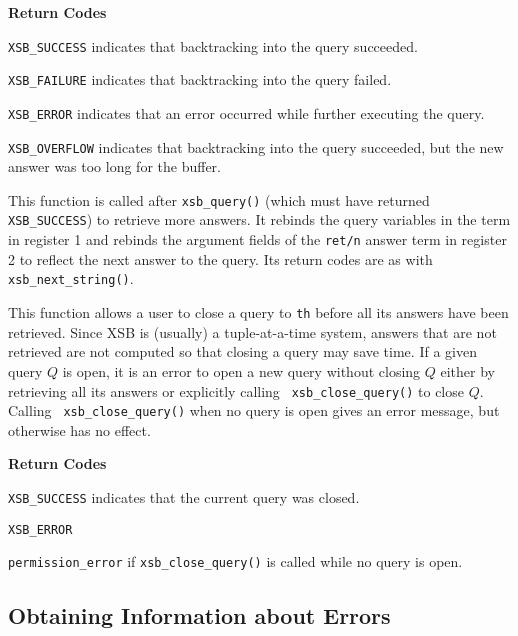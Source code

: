 \begin{description}
{\bf Return Codes}  
\bi
\item {\tt XSB\_SUCCESS} indicates that backtracking into the query succeeded.
%
\item {\tt XSB\_FAILURE} indicates that backtracking into the query failed.
%
\item {\tt XSB\_ERROR} indicates that an error occurred while further
  executing the query.

\item {\tt XSB\_OVERFLOW} indicates that backtracking into the query succeeded, but the
  new answer was too long for the buffer.
%
\ei

  
%
This function is called after {\tt xsb\_query()} (which must have
returned {\tt XSB\_SUCCESS}) to retrieve more answers.  It rebinds the
query variables in the term in register 1 and rebinds the argument
fields of the {\tt ret/n} answer term in register 2 to reflect the
next answer to the query.  Its return codes are as with {\tt
  xsb\_next\_string()}.

 
%
This function allows a user to close a query to {\tt th} before all
its answers have been retrieved.  Since XSB is (usually) a
tuple-at-a-time system, answers that are not retrieved are not
computed so that closing a query may save time.  If a given query $Q$
is open, it is an error to open a new query without closing $Q$ either
by retrieving all its answers or explicitly calling {\tt
  xsb\_close\_query()} to close $Q$.  Calling {\tt
  xsb\_close\_query()} when no query is open gives an error message,
but otherwise has no effect.

{\bf Return Codes}  
\bi
\item {\tt XSB\_SUCCESS} indicates that the current query was closed.
%
\item {\tt XSB\_ERROR} 
\bi
\item {\tt permission\_error} if {\tt xsb\_close\_query()} is
  called while no query is open.
\ei
\ei
\end{description}

\subsection{Obtaining Information about Errors}

